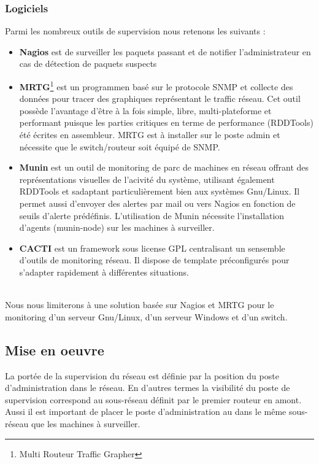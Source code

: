 \documentclass[a4paper]{article}
\begin{document}
\subsubsection{Logiciels}

Parmi les nombreux outils de supervision nous retenons les suivants :
\begin{itemize}
\item \textbf{Nagios} est de surveiller les paquets passant et de notifier l'administrateur en cas de détection de paquets suspects
\item \textbf{MRTG}\footnote{Multi Routeur Traffic Grapher} est un programmen basé sur le protocole SNMP et collecte des données pour tracer des graphiques représentant le traffic réseau. Cet outil possède l'avantage d'être à la fois simple, libre, multi-plateforme et performant puisque les parties critiques en terme de performance (RDDTools) été écrites en assembleur. MRTG est à installer sur le poste admin et nécessite que le switch/routeur soit équipé de SNMP.
\item \textbf{Munin} est un outil de monitoring de parc de machines en réseau offrant des représentations visuelles de l'acivité du système, utilisant également RDDTools et sadaptant particulièrement bien aux systèmes Gnu/Linux. Il permet aussi d'envoyer des alertes par mail ou vers Nagios en fonction de seuils d'alerte prédéfinis. L'utilisation de Munin nécessite l'installation d'agents (munin-node) sur les machines à surveiller.
\item \textbf{CACTI} est un framework sous license GPL centralisant un sensemble d'outils de monitoring réseau. Il dispose de template préconfigurés pour s'adapter rapidement à différentes situations.
\end{itemize}
~\\
Nous nous limiterons à une solution basée sur Nagios et MRTG pour le monitoring d'un serveur Gnu/Linux, d'un serveur Windows et d'un switch. 

\subsection{Mise en oeuvre}
La portée de la supervision du réseau est définie par la position du poste d'administration dans le réseau. En d'autres termes la visibilité du poste de supervision correspond au sous-réseau définit par le premier routeur en amont. Aussi il est important de placer le poste d'administration au dans le même sous-réseau que les machines à surveiller.
\end{document}
